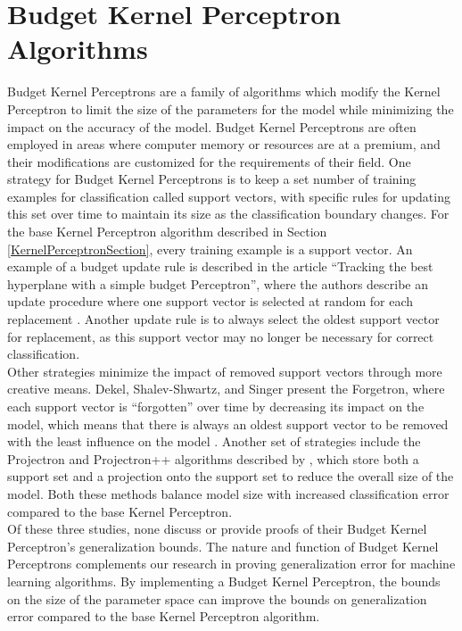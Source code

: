 \section{Budget Kernel Perceptron Algorithms}\label{BudgetKernelPerceptronSection}
Budget Kernel Perceptrons are a family of algorithms which modify the Kernel Perceptron to limit the size of the parameters for the model while minimizing the impact on the accuracy of the model. Budget Kernel Perceptrons are often employed in areas where computer memory or resources are at a premium, and their modifications are customized for the requirements of their field. One strategy for Budget Kernel Perceptrons is to keep a set number of training examples for classification called support vectors, with specific rules for updating this set over time to maintain its size as the classification boundary changes. For the base Kernel Perceptron algorithm described in Section \ref{KernelPerceptronSection}, every training example is a support vector. An example of a budget update rule is described in the article ``Tracking the best hyperplane with a simple budget Perceptron'', where the authors describe an update procedure where one support vector is selected at random for each replacement \cite{CCBG07}. Another update rule is to always select the oldest support vector for replacement, as this support vector may no longer be necessary for correct classification. 
\\Other strategies minimize the impact of removed support vectors through more creative means. Dekel, Shalev-Shwartz, and Singer present the Forgetron, where each support vector is ``forgotten'' over time by decreasing its impact on the model, which means that there is always an oldest support vector to be removed with the least influence on the model \cite{DSSS07}. Another set of strategies include the Projectron and Projectron++ algorithms described by \cite{OKC09}, which store both a support set and a projection onto the support set to reduce the overall size of the model. Both these methods balance model size with increased classification error compared to the base Kernel Perceptron.
\\Of these three studies, none discuss or provide proofs of their Budget Kernel Perceptron's generalization bounds. The nature and function of Budget Kernel Perceptrons complements our research in proving generalization error for machine learning algorithms. By implementing a Budget Kernel Perceptron, the bounds on the size of the parameter space can improve the bounds on generalization error compared to the base Kernel Perceptron algorithm.
